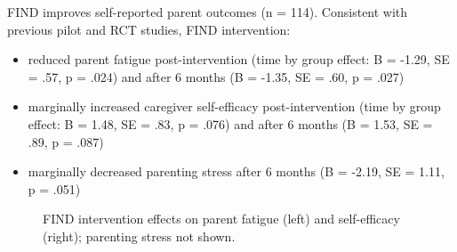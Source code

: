 \documentclass[final]{beamer}
\newlength{\colwidth}
\begin{document}
\begin{frame}[t]
\begin{columns}[t]
\begin{column}{\colwidth}
\begin{block}{FIND improves self-reported parent outcomes (n = 114).}
    Consistent with previous pilot and RCT studies, FIND intervention:
    \vspace{-0.3cm}
    \begin{itemize}
        \item reduced parent fatigue post-intervention (time by group effect: B = -1.29, SE = .57, p = .024) and after 6 months (B = -1.35, SE = .60, p = .027)
        \item marginally increased caregiver self-efficacy post-intervention (time by group effect: B = 1.48, SE = .83, p = .076) and after 6 months (B = 1.53, SE = .89, p = .087)
        \item marginally decreased parenting stress after 6 months (B = -2.19, SE = 1.11, p = .051)
    \end{itemize}
    \vspace{-0.5cm}
    \begin{figure}[ht]
        \centering
        {\small FIND intervention effects on parent fatigue (left) and self-efficacy (right); parenting stress not shown.}
        \label{fig:combined}
    \end{figure} 
    

\end{block}
\end{column}
\end{columns}
\end{frame}
\end{document}
